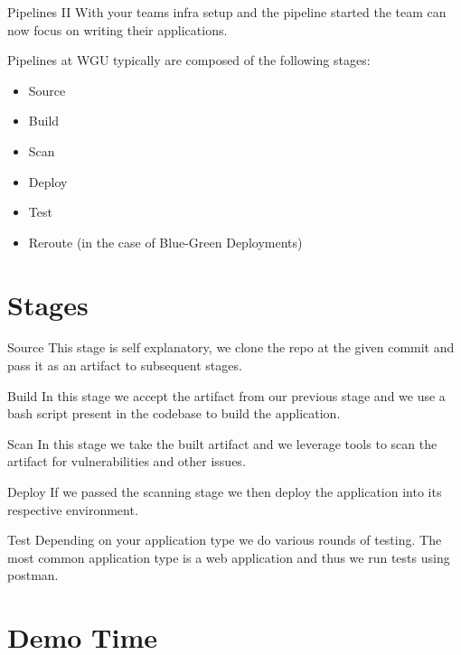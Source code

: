 \documentclass{beamer}
\begin{document}
    \begin{frame}{Pipelines II}
      With your teams infra setup and the pipeline started the team can now
      focus on writing their applications.

      Pipelines at WGU typically are composed of the following stages:
      \begin{itemize}
        \item Source
        \item Build
        \item Scan
        \item Deploy
        \item Test
        \item Reroute (in the case of Blue-Green Deployments)
      \end{itemize}
    \end{frame}

  \section{Stages}
    \begin{frame}{Source}
      This stage is self explanatory, we clone the repo at the 
      given commit and pass it as an artifact to subsequent stages.
    \end{frame}

    \begin{frame}{Build}
      In this stage we accept the artifact from our previous stage
      and we use a bash script present in the codebase to build the
      application.
    \end{frame}

    \begin{frame}{Scan}
      In this stage we take the built artifact and we leverage tools
      to scan the artifact for vulnerabilities and other issues.
    \end{frame}

    \begin{frame}{Deploy}
      If we passed the scanning stage we then deploy the application
      into its respective environment.
    \end{frame}

    \begin{frame}{Test}
      Depending on your application type we do various rounds of testing.
      The most common application type is a web application and thus we
      run tests using postman.
    \end{frame}

  \section{Demo Time}
\end{document}

